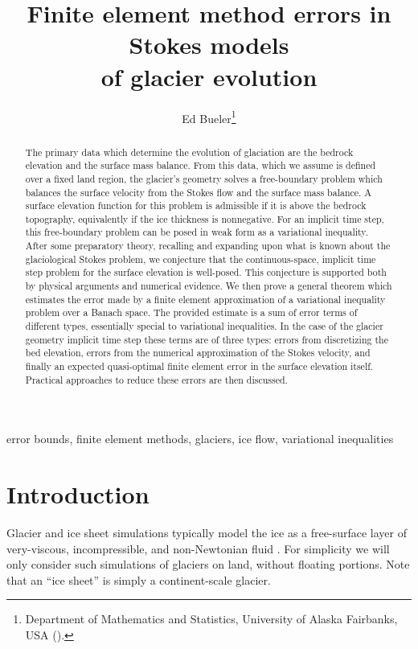 \documentclass[hidelinks,onefignum,onetabnum,final]{siamart220329}  %
\title{Finite element method errors in Stokes models \\ of glacier evolution}
\author{Ed Bueler\thanks{Department of Mathematics and Statistics, University of Alaska Fairbanks, USA (\email{elbueler@alaska.edu}).}}
\begin{document}
\maketitle

\begin{abstract}
The primary data which determine the evolution of glaciation are the bedrock elevation and the surface mass balance.  From this data, which we assume is defined over a fixed land region, the glacier's geometry solves a free-boundary problem which balances the surface velocity from the Stokes flow and the surface mass balance.  A surface elevation function for this problem is admissible if it is above the bedrock topography, equivalently if the ice thickness is nonnegative.  For an implicit time step, this free-boundary problem can be posed in weak form as a variational inequality.  After some preparatory theory, recalling and expanding upon what is known about the glaciological Stokes problem, we conjecture that the continuous-space, implicit time step problem for the surface elevation is well-posed.  This conjecture is supported both by physical arguments and numerical evidence.  We then prove a general theorem which estimates the error made by a finite element approximation of a variational inequality problem over a Banach space.  The provided estimate is a sum of error terms of different types, essentially special to variational inequalities.  In the case of the glacier geometry implicit time step these terms are of three types: errors from discretizing the bed elevation, errors from the numerical approximation of the Stokes velocity, and finally an expected quasi-optimal finite element error in the surface elevation itself.  Practical approaches to reduce these errors are then discussed.
\end{abstract}

\begin{keywords}
error bounds, finite element methods, glaciers, ice flow, variational inequalities
\end{keywords}


\section{Introduction} \label{sec:intro}

Glacier and ice sheet simulations typically model the ice as a free-surface layer of very-viscous, incompressible, and non-Newtonian fluid \cite{GreveBlatter2009,SchoofHewitt2013}.  For simplicity we will only consider such simulations of glaciers on land, without floating portions.  Note that an ``ice sheet'' is simply a continent-scale glacier.
\end{document}
